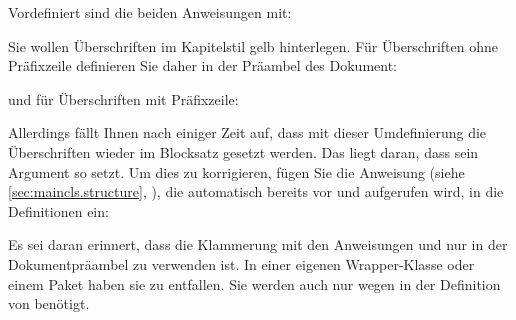 Vordefiniert sind die beiden Anweisungen mit:
\begin{lstcode}
  \newcommand{\chapterlinesformat}[3]{%
    \@hangfrom{#2}{#3}%
  }
  \newcommand{\chapterlineswithprefixformat}[3]{#2#3}
\end{lstcode}

\begin{Example}
  Sie wollen Überschriften im Kapitelstil gelb hinterlegen. Für
  Überschriften ohne Präfixzeile definieren Sie daher in der Präambel des
  Dokument:
\begin{lstcode}[moretexcs={colorbox}]
  \makeatletter
  \renewcommand{\chapterlinesformat}[3]{%
    \colorbox{yellow}{%
      \parbox{\dimexpr\linewidth
                      -2\fboxrule-2\fboxsep}{%
        \@hangfrom{#2}#3%
      }%
    }%
  }
  \makeatother
\end{lstcode}
  und für Überschriften mit Präfixzeile:
\begin{lstcode}[moretexcs={colorbox}]
  \renewcommand{\chapterlineswithprefixformat}[3]{%
    \colorbox{yellow}{%
      \parbox{\dimexpr\linewidth
                      -2\fboxrule-2\fboxsep}{%
        #2#3%
      }%
    }%
  }
\end{lstcode}
  Allerdings fällt Ihnen nach einiger Zeit auf, dass mit dieser Umdefinierung 
  die Überschriften wieder im Blocksatz gesetzt werden. Das liegt daran, dass
   sein Argument so setzt. Um dies zu korrigieren, fügen Sie die
  Anweisung  (siehe
  \autoref{sec:maincls.structure}, ),
  die automatisch bereits vor  und
   aufgerufen wird, in die Definitionen
  ein:
\begin{lstcode}[moretexcs={colorbox}]
  \makeatletter
  \renewcommand{\chapterlinesformat}[3]{%
    \colorbox{yellow}{%
      \parbox{\dimexpr\linewidth
                      -2\fboxrule-2\fboxsep}{%
        \raggedchapter
        \@hangfrom{#2}#3%
      }%
    }%
  }
  \makeatother
  \renewcommand{\chapterlineswithprefixformat}[3]{%
    \colorbox{yellow}{%
      \parbox{\dimexpr\linewidth
                      -2\fboxrule-2\fboxsep}{%
        \raggedchapter
        #2#3%
      }%
    }%
  }
\end{lstcode}
  Es sei daran erinnert, dass die Klammerung mit den Anweisungen
   und  nur in der Dokumentpräambel zu
  verwenden ist. In einer eigenen Wrapper-Klasse oder einem Paket haben sie zu
  entfallen. Sie werden auch nur wegen  in der Definition von
   benötigt.%
\end{Example}

